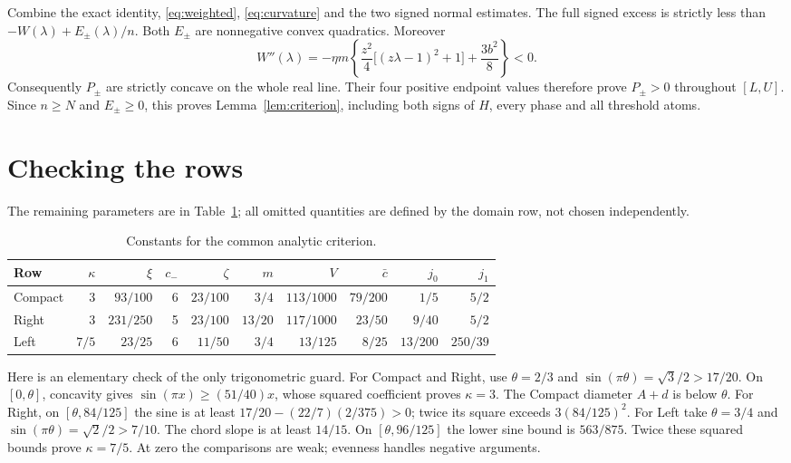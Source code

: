 \documentclass[11pt]{article}
\begin{document}
Combine the exact identity, \eqref{eq:weighted}, \eqref{eq:curvature}
and the two signed normal estimates. The full signed excess is strictly
less than $-W(\lambda)+E_\pm(\lambda)/n$.
Both $E_\pm$ are nonnegative convex quadratics.
Moreover
\[
W''(\lambda)=-\eta m\left\{
\frac{z^2}{4}\bigl[(z\lambda-1)^2+1\bigr]+\frac{3b^2}{8}\right\}<0.
\]
Consequently $P_\pm$ are strictly concave on the whole real line.
Their four positive endpoint values therefore prove $P_\pm>0$ throughout
$[L,U]$. Since $n\ge N$ and $E_\pm\ge0$, this proves
Lemma~\ref{lem:criterion}, including both signs of $H$, every phase and
all threshold atoms.

\section{Checking the rows}

The remaining parameters are in Table~\ref{tab:parameters}; all omitted
quantities are defined by the domain row, not chosen independently.
\begin{table}[h]
\centering\small
\begin{tabular}{lrrrrrrrrr}
\toprule
Row&$\kappa$&$\xi$&$c_-$&$\zeta$&$m$&$V$&$\bar c$&$j_0$&$j_1$\\
\midrule
Compact&3&$93/100$&6&$23/100$&$3/4$&$113/1000$&$79/200$&$1/5$&$5/2$\\
Right&3&$231/250$&5&$23/100$&$13/20$&$117/1000$&$23/50$&$9/40$&$5/2$\\
Left&$7/5$&$23/25$&6&$11/50$&$3/4$&$13/125$&$8/25$&$13/200$&$250/39$\\
\bottomrule
\end{tabular}
\caption{Constants for the common analytic criterion.}\label{tab:parameters}
\end{table}

Here is an elementary check of the only trigonometric guard.
For Compact and Right, use $\theta=2/3$ and
$\sin(\pi\theta)=\sqrt3/2>17/20$. On $[0,\theta]$, concavity gives
$\sin(\pi x)\ge(51/40)x$, whose squared coefficient proves $\kappa=3$.
The Compact diameter $A+d$ is below $\theta$.
For Right, on $[\theta,84/125]$ the sine is at least
$17/20-(22/7)(2/375)>0$; twice its square exceeds
$3(84/125)^2$.
For Left take $\theta=3/4$ and
$\sin(\pi\theta)=\sqrt2/2>7/10$.
The chord slope is at least $14/15$. On
$[\theta,96/125]$ the lower sine bound is $563/875$.
Twice these squared bounds prove $\kappa=7/5$.
At zero the comparisons are weak; evenness handles negative arguments.
\end{document}
